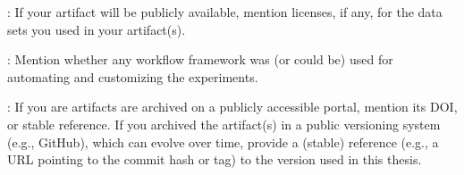 :
%
If your artifact will be publicly available, mention licenses, if any, for the
data sets you used in your artifact(s).

:
%
Mention whether any workflow framework was (or could be) used for automating and
customizing the experiments.

:
%
If you are artifacts are archived on a publicly accessible portal, mention its
DOI, or stable reference.
%
If you archived the artifact(s) in a public versioning system (e.g., GitHub), which can evolve over
time, provide a (stable) reference (e.g., a URL pointing to the commit hash or
tag) to the version used in this thesis.


